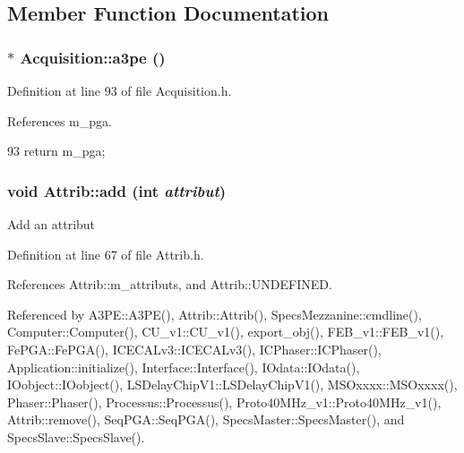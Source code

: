 \subsection{Member Function Documentation}
\hypertarget{classAcquisition_a8af496b6202d2509814e3b02197a5e73}{
\subsubsection[{a3pe}]{$\ast$ Acquisition::a3pe ()}}
\label{classAcquisition_a8af496b6202d2509814e3b02197a5e73}


Definition at line 93 of file Acquisition.h.

References m\_\-pga.


\begin{DoxyCode}
93 {return m_pga;}
\end{DoxyCode}
\hypertarget{classAttrib_a235f773af19c900264a190b00a3b4ad7}{
\subsubsection[{add}]{\setlength{\rightskip}{0pt plus 5cm}void Attrib::add (int {\em attribut})}}
\label{classAttrib_a235f773af19c900264a190b00a3b4ad7}
Add an attribut 

Definition at line 67 of file Attrib.h.

References Attrib::m\_\-attributs, and Attrib::UNDEFINED.

Referenced by A3PE::A3PE(), Attrib::Attrib(), SpecsMezzanine::cmdline(), Computer::Computer(), CU\_\-v1::CU\_\-v1(), export\_\-obj(), FEB\_\-v1::FEB\_\-v1(), FePGA::FePGA(), ICECALv3::ICECALv3(), ICPhaser::ICPhaser(), Application::initialize(), Interface::Interface(), IOdata::IOdata(), IOobject::IOobject(), LSDelayChipV1::LSDelayChipV1(), MSOxxxx::MSOxxxx(), Phaser::Phaser(), Processus::Processus(), Proto40MHz\_\-v1::Proto40MHz\_\-v1(), Attrib::remove(), SeqPGA::SeqPGA(), SpecsMaster::SpecsMaster(), and SpecsSlave::SpecsSlave().


